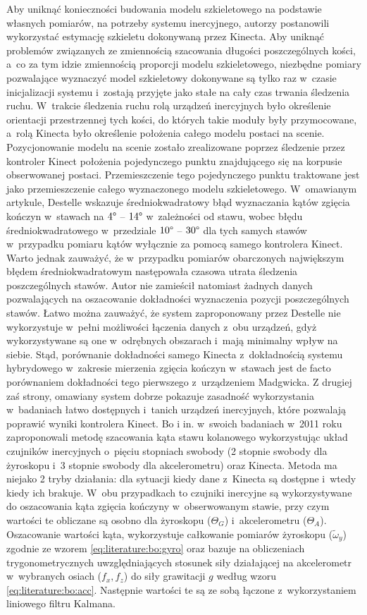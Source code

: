Aby uniknąć konieczności budowania modelu szkieletowego na podstawie własnych pomiarów, na potrzeby systemu inercyjnego, autorzy postanowili wykorzystać estymację szkieletu dokonywaną przez Kinecta. Aby uniknąć problemów związanych ze zmiennością szacowania długości poszczególnych kości, a~co za tym idzie zmiennością proporcji modelu szkieletowego, niezbędne pomiary pozwalające wyznaczyć model szkieletowy dokonywane są tylko raz w~czasie inicjalizacji systemu i~zostają przyjęte jako stałe na cały czas trwania śledzenia ruchu. W~trakcie śledzenia ruchu rolą urządzeń inercyjnych było określenie orientacji przestrzennej tych kości, do których takie moduły były przymocowane, a~rolą Kinecta było określenie położenia całego modelu postaci na scenie. Pozycjonowanie modelu na scenie zostało zrealizowane poprzez śledzenie przez kontroler Kinect położenia pojedynczego punktu znajdującego się na korpusie obserwowanej postaci. Przemieszczenie tego pojedynczego punktu traktowane jest jako przemieszczenie całego wyznaczonego modelu szkieletowego. W~omawianym artykule, Destelle wskazuje średniokwadratowy błąd wyznaczania kątów zgięcia kończyn w~stawach na $4\degree$ -- $14\degree$ w~zależności od stawu, wobec błędu średniokwadratowego w~przedziale $10\degree$ -- $30\degree$ dla tych samych stawów w~przypadku pomiaru kątów wyłącznie za pomocą samego kontrolera Kinect. Warto jednak zauważyć, że w~przypadku pomiarów obarczonych największym błędem średniokwadratowym następowała czasowa utrata śledzenia poszczególnych stawów. Autor nie zamieścił natomiast żadnych danych pozwalających na oszacowanie dokładności wyznaczenia pozycji poszczególnych stawów. Łatwo można zauważyć, że system zaproponowany przez Destelle nie wykorzystuje w~pełni możliwości łączenia danych z~obu urządzeń, gdyż wykorzystywane są one w~odrębnych obszarach i~mają minimalny wpływ na siebie. Stąd, porównanie dokładności samego Kinecta z~dokładnością systemu hybrydowego w~zakresie mierzenia zgięcia kończyn w~stawach jest de facto porównaniem dokładności tego pierwszego z~urządzeniem Madgwicka. Z drugiej zaś strony, omawiany system dobrze pokazuje zasadność wykorzystania w~badaniach łatwo dostępnych i~tanich urządzeń inercyjnych, które pozwalają poprawić wyniki kontrolera Kinect.																																																	
Bo i in. \cite{Bo2011a} w~swoich badaniach w~2011 roku zaproponowali metodę szacowania kąta stawu kolanowego wykorzystując układ czujników inercyjnych o~pięciu stopniach swobody (2 stopnie swobody dla żyroskopu i~3 stopnie swobody dla akcelerometru) oraz Kinecta. Metoda ma niejako 2 tryby działania: dla sytuacji kiedy dane z~Kinecta są dostępne i~wtedy kiedy ich brakuje. W~obu przypadkach to czujniki inercyjne są wykorzystywane do oszacowania kąta zgięcia kończyny w~obserwowanym stawie, przy czym wartości te obliczane są osobno dla żyroskopu ($\Theta_G$) i~akcelerometru ($\Theta_A$). Oszacowanie wartości kąta, wykorzystuje całkowanie pomiarów żyroskopu ($\tilde{\omega}_y$) zgodnie ze wzorem \ref{eq:literature:bo:gyro} oraz bazuje na obliczeniach trygonometrycznych uwzględniających stosunek siły działającej na akcelerometr w~wybranych osiach ($f_x , f_z$) do siły grawitacji $g$ według wzoru \ref{eq:literature:bo:acc}. Następnie wartości te są ze sobą łączone z~wykorzystaniem liniowego filtru Kalmana.
